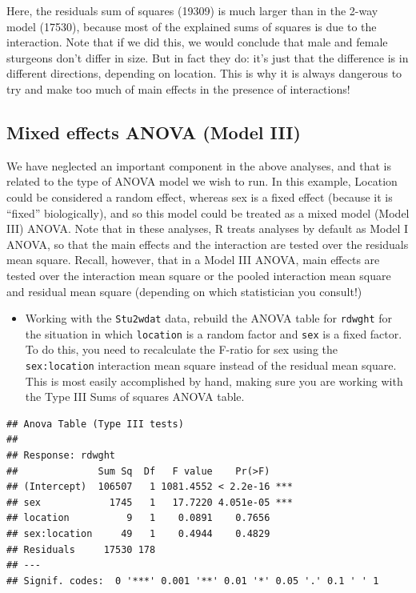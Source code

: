 \documentclass[
  12pt,
]{book}
\providecommand{\tightlist}{%
  \setlength{\itemsep}{0pt}\setlength{\parskip}{0pt}}
\begin{document}
Here, the residuals sum of squares (19309) is much larger than in the 2-way model (17530), because most of the explained sums of squares is due to the interaction. Note that if we did this, we would conclude that male and female sturgeons don't differ in size. But in fact they do: it's just that the difference is in different directions, depending on location. This is why it is always dangerous to try and make too much of main effects in the presence of interactions!

\hypertarget{mixed-effects-anova-model-iii}{%
\subsection{Mixed effects ANOVA (Model III)}\label{mixed-effects-anova-model-iii}}

We have neglected an important component in the above analyses, and that is related to the type of ANOVA model we wish to run. In this example, Location could be considered a random effect, whereas sex is a fixed effect (because it is ``fixed'' biologically), and so this model could be treated as a mixed model (Model III) ANOVA. Note that in these analyses, R treats analyses by default as Model I ANOVA, so that the main effects and the interaction are tested over the residuals mean square. Recall, however, that in a Model III ANOVA, main effects are tested over the interaction mean square or the pooled interaction mean square and residual mean square (depending on which statistician you consult!)

\begin{itemize}
\tightlist
\item
  Working with the \texttt{Stu2wdat} data, rebuild the ANOVA table for \texttt{rdwght}
  for the situation in which \texttt{location} is a random factor and \texttt{sex} is a
  fixed factor. To do this, you need to recalculate the F-ratio for sex using the \texttt{sex:location} interaction mean square instead of the residual mean square. This is most easily accomplished by hand, making sure you are working with the Type III Sums of squares ANOVA table.
\end{itemize}

\begin{verbatim}
## Anova Table (Type III tests)
## 
## Response: rdwght
##              Sum Sq  Df   F value    Pr(>F)    
## (Intercept)  106507   1 1081.4552 < 2.2e-16 ***
## sex            1745   1   17.7220 4.051e-05 ***
## location          9   1    0.0891    0.7656    
## sex:location     49   1    0.4944    0.4829    
## Residuals     17530 178                        
## ---
## Signif. codes:  0 '***' 0.001 '**' 0.01 '*' 0.05 '.' 0.1 ' ' 1
\end{verbatim}
\end{document}
